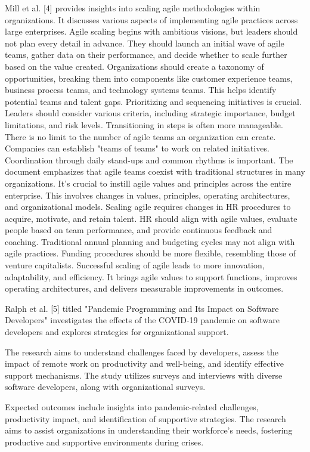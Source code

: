 \documentclass[conference]{IEEEtran}
\begin{document}
Mill et al. [4] provides insights into scaling agile methodologies within organizations. It discusses various aspects of implementing agile practices across large enterprises. Agile scaling begins with ambitious visions, but leaders should not plan every detail in advance. They should launch an initial wave of agile teams, gather data on their performance, and decide whether to scale further based on the value created. Organizations should create a taxonomy of opportunities, breaking them into components like customer experience teams, business process teams, and technology systems teams. This helps identify potential teams and talent gaps. Prioritizing and sequencing initiatives is crucial. Leaders should consider various criteria, including strategic importance, budget limitations, and risk levels. Transitioning in steps is often more manageable. There is no limit to the number of agile teams an organization can create. Companies can establish "teams of teams" to work on related initiatives. Coordination through daily stand-ups and common rhythms is important. The document emphasizes that agile teams coexist with traditional structures in many organizations. It's crucial to instill agile values and principles across the entire enterprise. This involves changes in values, principles, operating architectures, and organizational models. Scaling agile requires changes in HR procedures to acquire, motivate, and retain talent. HR should align with agile values, evaluate people based on team performance, and provide continuous feedback and coaching. Traditional annual planning and budgeting cycles may not align with agile practices. Funding procedures should be more flexible, resembling those of venture capitalists. Successful scaling of agile leads to more innovation, adaptability, and efficiency. It brings agile values to support functions, improves operating architectures, and delivers measurable improvements in outcomes.

Ralph et al. [5] titled "Pandemic Programming and Its Impact on Software Developers" investigates the effects of the COVID-19 pandemic on software developers and explores strategies for organizational support.

The research aims to understand challenges faced by developers, assess the impact of remote work on productivity and well-being, and identify effective support mechanisms. The study utilizes surveys and interviews with diverse software developers, along with organizational surveys.

Expected outcomes include insights into pandemic-related challenges, productivity impact, and identification of supportive strategies. The research aims to assist organizations in understanding their workforce's needs, fostering productive and supportive environments during crises.
\end{document}
